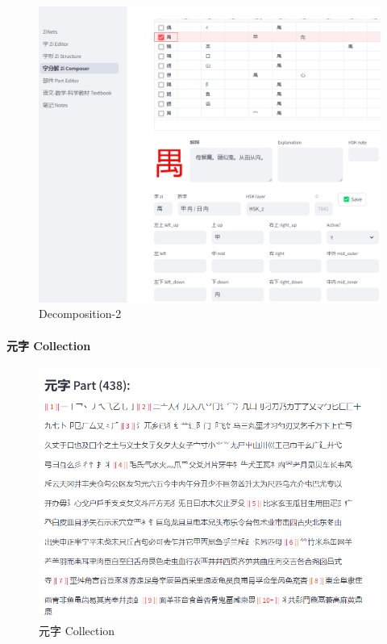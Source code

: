 \documentclass[
  11pt,
  letterpaper,
]{article}
\begin{document}
\begin{figure}
\centering
\includegraphics{./images/app_zi-parts-2.png}
\caption{Decomposition-2}
\end{figure}

\hypertarget{ux5143ux5b57-collection}{%
\paragraph{元字 Collection}\label{ux5143ux5b57-collection}}

\begin{figure}
\centering
\includegraphics{./images/app_zi-elements.png}
\caption{元字 Collection}
\end{figure}
\end{document}
